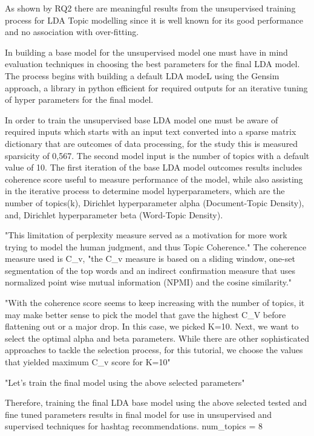 As shown by RQ2 there are meaningful results from the unsupervised training process for LDA Topic modelling since it is well known for its good performance and no association with over-fitting.

In building a base model for the unsupervised model one must have in mind evaluation techniques in choosing the best parameters for the final LDA model.  The process begins with building a default LDA modeL using the Gensim approach, a library in python efficient for required outputs for an iterative tuning of hyper parameters for the final model. 

In order to train the unsupervised base LDA model one must be aware of required inputs which starts with an input text converted into a sparse matrix dictionary that are outcomes of data processing, for the study this is measured sparsicity of 0,567.  The second model input is the number of topics with a default value of 10.  The first iteration of the base LDA model outcomes results includes coherence score useful to measure performance of the model, while also assisting in the iterative process to determine model hyperparameters, which are the number of topics(k), 
Dirichlet hyperparameter alpha (Document-Topic Density), and,
Dirichlet hyperparameter beta (Word-Topic Density).  

"This limitation of perplexity measure served as a motivation for more work trying to model the human judgment, and thus Topic Coherence."  The coherence measure used is C_v,  "the C_v measure is based on a sliding window, one-set segmentation of the top words and an indirect confirmation measure that uses normalized point wise mutual information (NPMI) and the cosine similarity."

"With the coherence score seems to keep increasing with the number of topics, it may make better sense to pick the model that gave the highest C_V before flattening out or a major drop. In this case, we picked K=10.  Next, we want to select the optimal alpha and beta parameters. While there are other sophisticated approaches to tackle the selection process, for this tutorial, we choose the values that yielded maximum C_v score for K=10"

"Let’s train the final model using the above selected parameters"

Therefore, training the final LDA base model using the above selected tested and fine tuned parameters results in final model for use in unsupervised and supervised techniques for hashtag recommendations.
num_topics = 8

